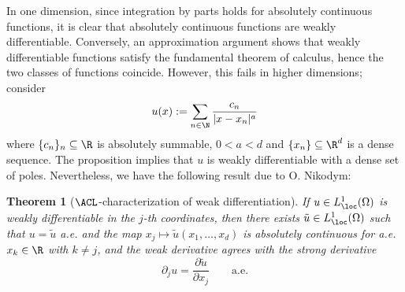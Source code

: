 \documentclass[reqno]{amsart}
\newtheorem{theorem}{Theorem}
\theoremstyle{definition}
\theoremstyle{remark}
\begin{document}
In one dimension, since integration by parts holds for absolutely continuous functions, it is clear that absolutely continuous functions are weakly differentiable. Conversely, an approximation argument shows that weakly differentiable functions satisfy the fundamental theorem of calculus, hence the two classes of functions coincide. However, this fails in higher dimensions; consider
	\[ u(x) := \sum_{n \in \N} \frac{c_n}{|x - x_n|^a} \]
where $\{ c_n \}_n \subseteq \R$ is absolutely summable, $0 < a < d$ and 	$\{x_n\} \subseteq \R^d$ is a dense sequence. The proposition implies that $u$ is weakly differentiable with a dense set of poles. Nevertheless, we have the following result due to O. Nikodym:

\begin{theorem}[$\ACL$-characterization of weak differentiation]
	If $u \in L^1_\loc (\Omega)$ is weakly differentiable in the $j$-th coordinates, then there exists $\tilde u \in L^1_\loc (\Omega)$ such that $u = \tilde u$ a.e. and the map $x_j \mapsto \tilde u(x_1, \dots, x_d)$ is absolutely continuous for a.e. $x_k \in \R$ with $k \neq j$, and the weak derivative agrees with the strong derivative
		\[ \partial_j u = \frac{\partial \tilde u}{\partial x_j} \qquad \text{a.e.} \]
\end{theorem}
\end{document}

